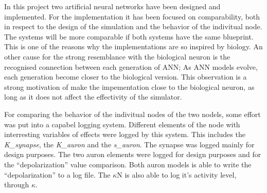 

%
%





In this project two artificial neural networks have been designed and implemented. 
For the implementation it has been focused on comparability, both in respect to the design of the simulation and the behavior of the indivitual node.
The systems will be more comparable if both systems have the same blueprint. 
This is one of the reasons why the implementations are so inspired by biology.
An other cause for the strong resemblance with the biological neuron is the recognised connection between each generation of ANN; As ANN models evolve, each generation become closer to the biological version. %
This observation is a strong motivation of make the impementation close to the biological neuron, as long as it does not affect the effectivity of the simulator. %

For comparing the behavior of the indivitual nodes of the two nodels, some effort was put into a capabel logging system. 
Different elements of the node with interresting variables of effects were logged by this system. This includes the \emph{K\_synapse}, the \emph{K\_auron} and the \emph{s\_auron}.
The synapse was logged mainly for design purposes. The two auron elements were logged for design purposes and for the ``depolarization'' value comparison.
Both auron models is able to write the ``depolarization'' to a log file. The $\kappa$N is also able to log it's activity level, through $\kappa$.

